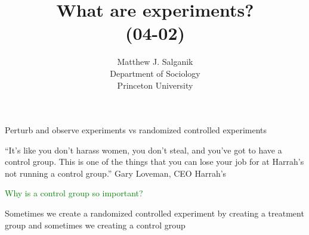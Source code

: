 \documentclass[aspectratio=169]{beamer}
\title[]{What are experiments?\\(04-02)}
\author[]{Matthew J. Salganik\\Department of Sociology\\Princeton University}
\date[]{Soc 596: Computational Social Science\\Fall 2016
\vfill
\begin{flushright}
\vspace{0.6in}
\texttt{[image: figures/cc.png]}
\end{flushright}
}
\def\vf{\vfill}
\begin{document}
\frame{\titlepage}
\begin{frame}

Perturb and observe experiments vs randomized controlled experiments

\end{frame}
\begin{frame}

``It's like you don't harass women, you don't steal, and you've got to have a control group. This is one of the things that you can lose your job for at Harrah's not running a control group.''
Gary Loveman, CEO Harrah's

\pause
\vf
\textcolor{green}{Why is a control group so important?}

\end{frame}
\begin{frame}

Sometimes we create a randomized controlled experiment by creating a treatment group and sometimes we creating a control group

\end{frame}
\end{document}
